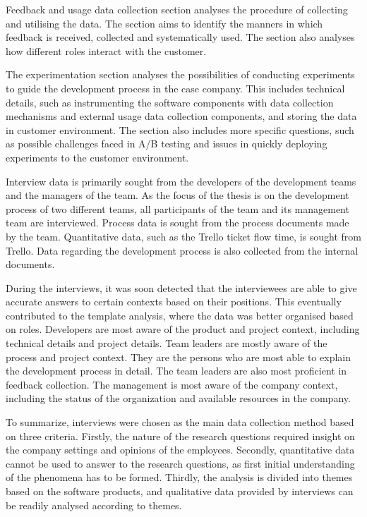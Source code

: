\documentclass[english]{tktltiki2}
\theoremstyle{definition}
\theoremstyle{remark}
\begin{document}
Feedback and usage data collection section analyses the procedure of collecting and utilising the data. The section aims to identify the manners in which feedback is received, collected and systematically used. The section also analyses how different roles interact with the customer. 

The experimentation section analyses the possibilities of conducting experiments to guide the development process in the case company. This includes technical details, such as instrumenting the software components with data collection mechanisms and external usage data collection components, and storing the data in customer environment. The section also includes more specific questions, such as possible challenges faced in A/B testing and issues in quickly deploying experiments to the customer environment.  

Interview data is primarily sought from the developers of the development teams and the managers of the team. As the focus of the thesis is on the development process of two different teams, all participants of the team and its management team are interviewed. Process data is sought from the process documents made by the team. Quantitative data, such as the Trello ticket flow time, is sought from Trello. Data regarding the development process is also collected from the internal documents.

During the interviews, it was soon detected that the interviewees are able to give accurate answers to certain contexts based on their positions. This eventually contributed to the template analysis, where the data was better organised based on roles. Developers are most aware of the product and project context, including technical details and project details. Team leaders are mostly aware of the process and project context. They are the persons who are most able to explain the development process in detail. The team leaders are also most proficient in feedback collection. The management is most aware of the company context, including the status of the organization and available resources in the company. 

To summarize, interviews were chosen as the main data collection method based on three criteria. Firstly, the nature of the research questions required insight on the company settings and opinions of the employees. Secondly, quantitative data cannot be used to answer to the research questions, as first initial understanding of the phenomena has to be formed. Thirdly, the analysis is divided into themes based on the software products, and qualitative data provided by interviews can be readily analysed according to themes.
\end{document}
